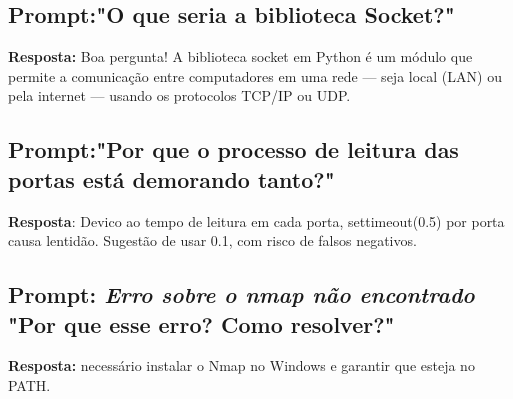 \documentclass[12pt]{article}
\begin{document}
\subsection{\textbf{Prompt:}"O que seria a biblioteca Socket?"}
    \textbf{Resposta:} Boa pergunta! A biblioteca socket em Python é um módulo que permite a comunicação entre computadores em uma rede — seja local (LAN) ou pela internet — usando os protocolos TCP/IP ou UDP.
    
\subsection{\textbf{Prompt:}"Por que o processo de leitura das portas está demorando tanto?"}
    \textbf{Resposta}: Devico ao tempo de leitura em cada porta, settimeout(0.5) por porta causa lentidão. Sugestão de usar 0.1, com risco de falsos negativos.
\subsection{\textbf{Prompt:}\textit{ Erro sobre o nmap não encontrado} "Por que esse erro? Como resolver?"}
    \textbf{Resposta:} necessário instalar o Nmap no Windows e garantir que esteja no PATH.
\end{document}
